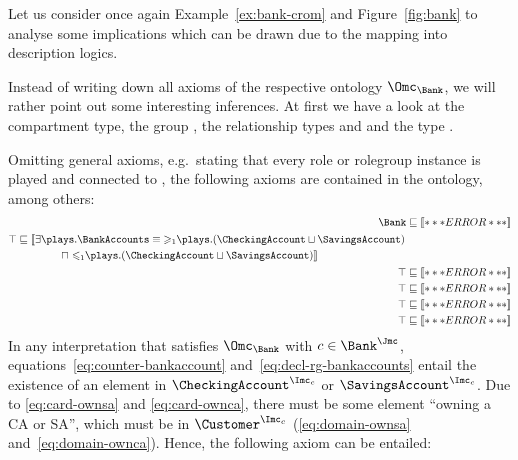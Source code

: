 Let us consider once again Example~\ref{ex:bank-crom} and Figure~\ref{fig:bank} to analyse some
implications which can be drawn due to the mapping into description logics.

\begin{example}
  Instead of writing down all axioms of the respective ontology $\Omc_{\Bank}$, we will rather point
  out some interesting inferences. At first we have a look at the \Bank compartment type, the
  \rosirole group \BankAccounts, the relationship types \ownca and \ownsa and the \rosirole type
  \Customer.

  Omitting general axioms, e.g.\ stating that every role or rolegroup instance is played and
  connected to \occurCounter, the following axioms are contained in the ontology, among others:
  \begin{align}
    \Bank & \sqsubseteq \oax{(\atleast{1}{\counts}{\BankAccounts})(\occurCounter)}\label{eq:counter-bankaccount}\\
    \begin{split}
      \top & \sqsubseteq \oaxl{\exists\plays.\BankAccounts \equiv \atleast{1}{\plays}{(\CheckingAccount\sqcup\SavingsAccount)}}\\
      & \qquad\qquad \sqcap \oaxr{\atmost{1}{\plays}{(\CheckingAccount\sqcup\SavingsAccount)}}
    \end{split}\label{eq:decl-rg-bankaccounts}\\
    \top & \sqsubseteq \oax{\SavingsAccount\sqsubseteq\atleast{1}{\ownsa^{-}}{\top}}\label{eq:card-ownsa}\\
    \top & \sqsubseteq \oax{\CheckingAccount\sqsubseteq\atleast{1}{\ownca^{-}}{\top}}\label{eq:card-ownca}\\
    \top & \sqsubseteq \oax{\exists\ownsa.\top\sqsubseteq\Customer}\label{eq:domain-ownsa}\\
    \top & \sqsubseteq \oax{\exists\ownca.\top\sqsubseteq\Customer}\label{eq:domain-ownca}
  \end{align}
  In any interpretation \J that satisfies $\Omc_{\Bank}$ with $c\in\Bank^{\J}$,
  equations~\eqref{eq:counter-bankaccount} and~\eqref{eq:decl-rg-bankaccounts} entail the existence
  of an element in $\CheckingAccount^{\I_{c}}$ or $\SavingsAccount^{\I_{c}}$. Due to
  \eqref{eq:card-ownsa} and \eqref{eq:card-ownca}, there must be some element ``owning a CA or SA'',
  which must be in $\Customer^{\I_{c}}$ (\eqref{eq:domain-ownsa}
  and~\eqref{eq:domain-ownca}). Hence, the following axiom can be entailed:

\end{example}
